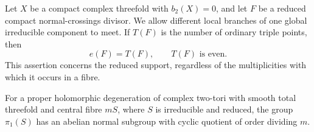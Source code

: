 \begin{proposition}[P4.6]\hypertarget{tag-02XY}{}\label{night:P4.6}\label{stmt:P4.6}


Let $X$ be a compact complex threefold with $b_2(X)=0$, and let $F$ be a
reduced compact normal-crossings divisor. We allow different local
branches of one global irreducible component to meet. If $T(F)$ is the
number of ordinary triple points, then
\[
 e(F)=T(F),\qquad T(F)\text{ is even}.
\]
This assertion concerns the reduced support, regardless of the
multiplicities with which it occurs in a fibre.
\end{proposition}

\begin{proposition}[P4R.1]\hypertarget{tag-02Y2}{}\label{night:P4R.1}\label{stmt:P4R.1}


For a proper holomorphic degeneration of complex two-tori with
smooth total threefold and central fibre $mS$, where $S$ is
irreducible and reduced, the group $\pi_1(S)$ has an abelian
normal subgroup with cyclic quotient of order dividing $m$.
\end{proposition}

